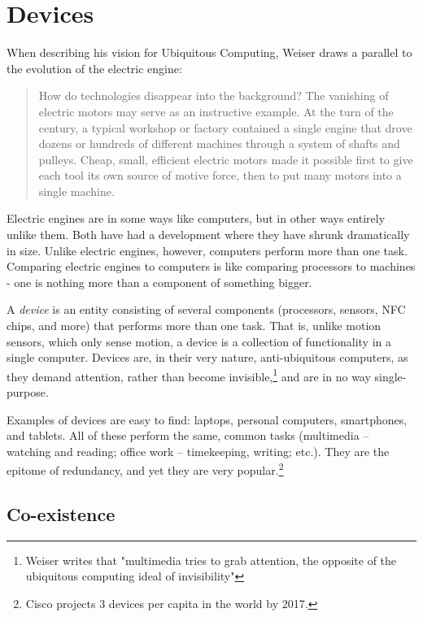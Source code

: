 \section{Devices}

When describing his vision for Ubiquitous Computing, Weiser draws a parallel to the evolution of the electric engine:

\begin{quote}
    How do technologies disappear into the background? The vanishing of electric motors may serve as an instructive example.
    At the turn of the century, a typical workshop or factory contained a single engine that drove dozens or hundreds of
    different machines through a system of shafts and pulleys. Cheap, small, efficient electric motors made it possible first
    to give each tool its own source of motive force, then to put many motors into a single machine.\cite{weiser91}
\end{quote}

Electric engines are in some ways like computers, but in other ways entirely unlike them. Both have had a development where
they have shrunk dramatically in size. Unlike electric engines, however, computers perform more than one task. Comparing electric
engines to computers is like comparing processors to machines - one is nothing more than a component of something bigger.

A \emph{device} is an entity consisting of several components (processors, sensors, NFC chips, and more) that performs more
than one task. That is, unlike motion sensors, which only sense motion, a device is a collection of functionality in a single
computer. Devices are, in their very nature, anti-ubiquitous computers, as they demand attention, rather than become
invisible,\footnote{Weiser writes that "multimedia tries to grab attention, the opposite of the ubiquitous computing ideal of
invisibility"\cite{weiser93}} and are in no way single-purpose.

Examples of devices are easy to find: laptops, personal computers, smartphones, and tablets. All of these perform the same, common
tasks (multimedia -- watching and reading; office work -- timekeeping, writing; etc.). They are the epitome of redundancy, and yet
they are very popular.\footnote{Cisco projects 3 devices per capita in the world by 2017.\cite{cisco}}

\subsection*{Co-existence}


